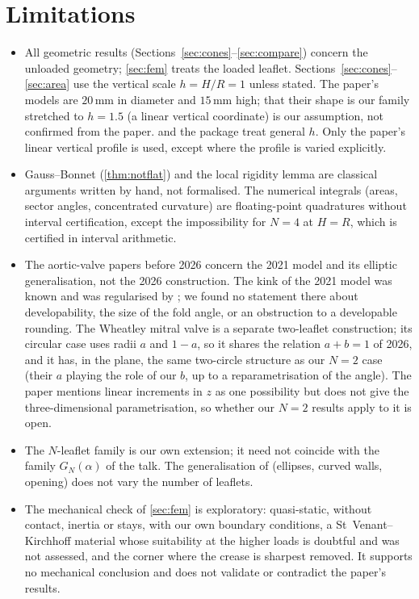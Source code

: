 \documentclass[11pt,a4paper]{article}
\theoremstyle{plain}
\theoremstyle{remark}
\begin{document}
\section{Limitations}\label{sec:lim}
\begin{itemize}
\item All geometric results (Sections~\ref{sec:cones}--\ref{sec:compare}) concern the unloaded geometry;
  \cref{sec:fem} treats the loaded leaflet. Sections~\ref{sec:cones}--\ref{sec:area} use the vertical scale $h=H/R=1$
  unless stated. The paper's models are $20$\,mm in diameter and $15$\,mm high; that their shape is our family stretched to
  $h=1.5$ (a linear vertical coordinate) is our assumption, not confirmed from the paper.  and the package
  treat general $h$. Only the paper's linear vertical profile is used, except where the profile is varied explicitly.
\item Gauss--Bonnet (\cref{thm:notflat}) and the local rigidity lemma are classical arguments written by hand, not
  formalised. The numerical integrals (areas, sector angles, concentrated curvature) are floating-point quadratures without
  interval certification, except the impossibility for $N=4$ at $H=R$, which is certified in interval arithmetic.
\item The aortic-valve papers before 2026 \citep{McKee2021,Rebolledo2023,Oliveira2022,Oliveira2024} concern the 2021 model
  and its elliptic generalisation, not the 2026 construction. The kink of the 2021 model was known and was regularised by
  \citet{Rebolledo2023}; we found no statement there about developability, the size of the fold angle, or an obstruction to a
  developable rounding. The Wheatley mitral valve \citep{Oliveira2025} is a separate two-leaflet construction; its circular
  case uses radii $a$ and $1-a$, so it shares the relation $a+b=1$ of 2026, and it has, in the plane, the same two-circle
  structure as our $N=2$ case (their $a$ playing the role of our $b$, up to a reparametrisation of the angle). The paper
  mentions linear increments in $z$ as one possibility but does not give the three-dimensional parametrisation, so whether
  our $N=2$ results apply to it is open.
\item The $N$-leaflet family is our own extension; it need not coincide with the family $G_N(\alpha)$ of the talk. The
  generalisation of \citet{Oliveira2022} (ellipses, curved walls, opening) does not vary the number of leaflets.
\item The mechanical check of \cref{sec:fem} is exploratory: quasi-static, without contact, inertia or stays, with our own
  boundary conditions, a St~Venant--Kirchhoff material whose suitability at the higher loads is doubtful and was not
  assessed, and the corner where the crease is sharpest removed. It supports no mechanical conclusion and does not validate
  or contradict the paper's results.
\end{itemize}
\end{document}
